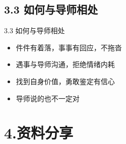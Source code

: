\documentclass[10pt,aspectratio=43,mathserif,table]{beamer}
\begin{document}
\subsection{3.3 如何与导师相处}
\begin{frame}{\small 3.3 如何与导师相处}
	
	\begin{itemize}
		\item \footnotesize 件件有着落，事事有回应，不拖沓
	\end{itemize}
	\vspace{0.4em}
		
	\begin{itemize}
		\item \footnotesize 遇事与导师沟通，拒绝情绪内耗
	\end{itemize}
	\vspace{0.4em}
	
	\begin{itemize}
		\item \footnotesize 找到自身价值，勇敢鉴定有信心
	\end{itemize}
	\vspace{0.4em}
	
	\begin{itemize}
		\item \footnotesize 导师说的也不一定对
	\end{itemize}
	\vspace{0.4em}
	
\end{frame}



\section{4.资料分享}  
\end{document}
